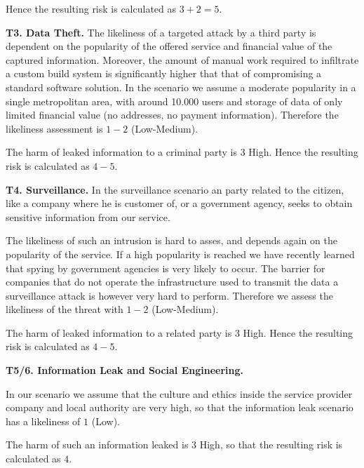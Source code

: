 Hence the resulting risk is calculated as $3+2 = 5$.

\textbf{T3. Data Theft.}
The likeliness of a targeted attack by a third party is dependent on
the popularity of the offered service and financial value of the
captured information. Moreover, the amount of manual work required to
infiltrate a custom build system is significantly higher that that of
compromising a standard software solution. In the scenario we assume a
moderate popularity in a single metropolitan area, with around 10.000
users and storage of data of only limited financial value (no
addresses, no payment information). Therefore the likeliness
assessment is $1-2$ (Low-Medium).

The harm of leaked information to a criminal party is $3$ High.
Hence the resulting risk is calculated as $4-5$.

\textbf{T4. Surveillance.}  In the surveillance scenario an party
related to the citizen, like a company where he is customer of, or a
government agency, seeks to obtain sensitive information from our
service.

The likeliness of such an intrusion is hard to asses, and depends
again on the popularity of the service. If a high popularity is
reached we have recently learned that spying by government agencies is
very likely to occur. The barrier for companies that do not operate
the infrastructure used to transmit the data a surveillance attack is
however very hard to perform. Therefore we assess the likeliness of
the threat with $1-2$ (Low-Medium).

The harm of leaked information to a related party is $3$ High.
Hence the resulting risk is calculated as $4-5$.

\textbf{T5/6. Information Leak and Social Engineering.}

In our scenario we assume that the culture and ethics inside the
service provider company and local authority are very high, so that
the information leak scenario has a likeliness of $1$ (Low).

The harm of such an information leaked is $3$ High, so that the
resulting risk is calculated as $4$.



